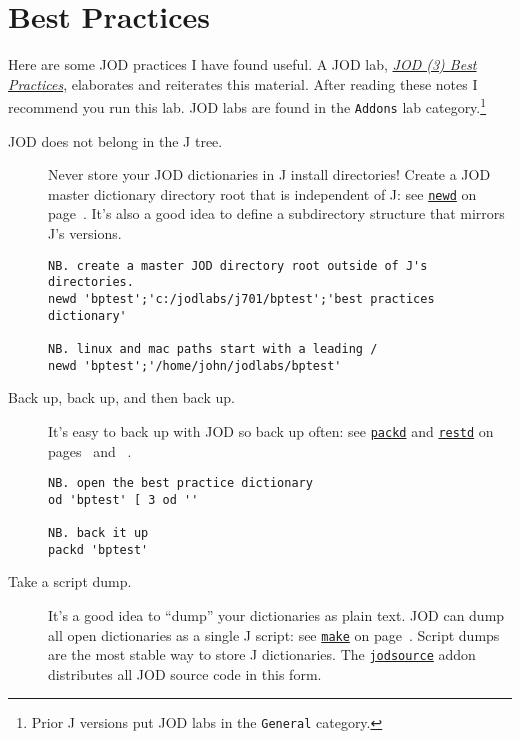 \section{Best Practices}

Here are some JOD practices I have found useful.  A JOD lab, \href{https://github.com/bakerjd99/jod/blob/master/jodnotebooks/JODBestPracticesLab.pdf}{\emph{JOD (3) Best Practices}}, elaborates and reiterates this material.  After 
reading these notes I recommend you run this lab.  JOD labs are 
found in the \texttt{Addons} lab category.\footnote{Prior J versions put JOD labs in the \texttt{General} category.}


\begin{description}
\item[JOD does not belong in the J tree.] Never store your JOD dictionaries in J install directories!  Create a JOD master dictionary directory root that is  independent of J: see \hyperlink{il:newd}{\texttt{newd}} on page~\pageref{ss:newd}.  It's also a good idea to define a subdirectory structure that mirrors J's versions. 

\begin{lstlisting}[frame=single,framerule=0pt]
NB. create a master JOD directory root outside of J's directories.
newd 'bptest';'c:/jodlabs/j701/bptest';'best practices dictionary'

NB. linux and mac paths start with a leading /
newd 'bptest';'/home/john/jodlabs/bptest'
\end{lstlisting}

\item[Back up, back up, and then back up.]  It's easy to back up with JOD so back up often: see 
\hyperlink{il:packd}{\texttt{packd}} and \hyperlink{il:restd}{\texttt{restd}} on pages~\pageref{ss:packd} and ~\pageref{ss:restd}.

\begin{lstlisting}[frame=single,framerule=0pt]
NB. open the best practice dictionary
od 'bptest' [ 3 od ''

NB. back it up
packd 'bptest'
\end{lstlisting}
 

\item[Take a script dump.]  It's a good idea to ``dump'' your dictionaries as plain text.  JOD can dump all open dictionaries as a single J script: see \hyperlink{il:make}{\texttt{make}} on page~\pageref{ss:make}. Script dumps are the most stable way to store J dictionaries.  The 
\href{https://www.jsoftware.com/jwiki/Addons/general/jodsource}{\texttt{jodsource}} addon 
distributes all JOD source code in this form.


\end{description}
